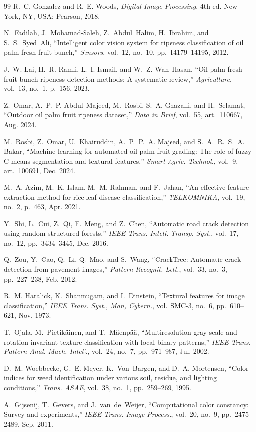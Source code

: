 \documentclass[conference]{IEEEtran}
\begin{document}
\begin{thebibliography}{99}
\scriptsize
{}
R.~C. Gonzalez and R.~E. Woods, \emph{Digital Image Processing}, 4th ed.
New York, NY, USA: Pearson, 2018.

N.~Fadilah, J.~Mohamad-Saleh, Z.~Abdul~Halim, H.~Ibrahim, and S.~S.~Syed~Ali,
``Intelligent color vision system for ripeness classification of oil palm
fresh fruit bunch,'' \emph{Sensors}, vol.~12, no.~10, pp.~14179--14195, 2012.

J.~W. Lai, H.~R. Ramli, L.~I. Ismail, and W.~Z. Wan~Hasan, ``Oil palm fresh
fruit bunch ripeness detection methods: A systematic review,''
\emph{Agriculture}, vol.~13, no.~1, p.~156, 2023.

Z.~Omar, A.~P.~P. Abdul~Majeed, M.~Rosbi, S.~A. Ghazalli, and H.~Selamat,
``Outdoor oil palm fruit ripeness dataset,'' \emph{Data in Brief}, vol.~55,
art.~110667, Aug. 2024.

M.~Rosbi, Z.~Omar, U.~Khairuddin, A.~P.~P.~A. Majeed, and S.~A.~R.~S.~A. Bakar,
``Machine learning for automated oil palm fruit grading: The role of fuzzy
C-means segmentation and textural features,'' \emph{Smart Agric. Technol.},
vol.~9, art.~100691, Dec. 2024.

M.~A. Azim, M.~K. Islam, M.~M. Rahman, and F.~Jahan, ``An effective feature
extraction method for rice leaf disease classification,'' \emph{TELKOMNIKA},
vol.~19, no.~2, p.~463, Apr. 2021.

Y.~Shi, L.~Cui, Z.~Qi, F.~Meng, and Z.~Chen, ``Automatic road crack detection
using random structured forests,'' \emph{IEEE Trans. Intell. Transp. Syst.},
vol.~17, no.~12, pp.~3434--3445, Dec. 2016.

Q.~Zou, Y.~Cao, Q.~Li, Q.~Mao, and S.~Wang, ``CrackTree: Automatic crack
detection from pavement images,'' \emph{Pattern Recognit. Lett.}, vol.~33,
no.~3, pp.~227--238, Feb. 2012.

R.~M. Haralick, K.~Shanmugam, and I.~Dinstein, ``Textural features for image
classification,'' \emph{IEEE Trans. Syst., Man, Cybern.}, vol.~SMC-3, no.~6,
pp.~610--621, Nov. 1973.

T.~Ojala, M.~Pietik\"ainen, and T.~M\"aenp\"a\"a, ``Multiresolution gray-scale
and rotation invariant texture classification with local binary patterns,''
\emph{IEEE Trans. Pattern Anal. Mach. Intell.}, vol.~24, no.~7, pp.~971--987,
Jul. 2002.

D.~M. Woebbecke, G.~E. Meyer, K.~Von~Bargen, and D.~A. Mortensen, ``Color
indices for weed identification under various soil, residue, and lighting
conditions,'' \emph{Trans. ASAE}, vol.~38, no.~1, pp.~259--269, 1995.

A.~Gijsenij, T.~Gevers, and J.~van~de~Weijer, ``Computational color constancy:
Survey and experiments,'' \emph{IEEE Trans. Image Process.}, vol.~20, no.~9,
pp.~2475--2489, Sep. 2011.

\end{thebibliography}
\end{document}
